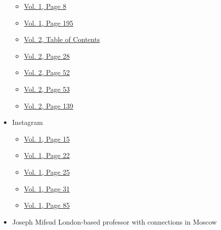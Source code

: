 \begin{itemize}
  \begin{itemize}
  \tightlist
  \item
    \protect\hyperlink{g-page-16}{Vol. 1, Page 8}
  \item
    \protect\hyperlink{g-page-203}{Vol. 1, Page 195}
  \item
    \protect\hyperlink{g-page-210}{Vol. 2, Table of Contents}
  \item
    \protect\hyperlink{g-page-240}{Vol. 2, Page 28}
  \item
    \protect\hyperlink{g-page-264}{Vol. 2, Page 52}
  \item
    \protect\hyperlink{g-page-265}{Vol. 2, Page 53}
  \item
    \protect\hyperlink{g-page-351}{Vol. 2, Page 139}
  \end{itemize}
\item
  Instagram

  \begin{itemize}
  \tightlist
  \item
    \protect\hyperlink{g-page-23}{Vol. 1, Page 15}
  \item
    \protect\hyperlink{g-page-30}{Vol. 1, Page 22}
  \item
    \protect\hyperlink{g-page-33}{Vol. 1, Page 25}
  \item
    \protect\hyperlink{g-page-39}{Vol. 1, Page 31}
  \item
    \protect\hyperlink{g-page-93}{Vol. 1, Page 85}
  \end{itemize}
\item
  Joseph Mifsud London-based professor with connections in Moscow


\end{itemize}
